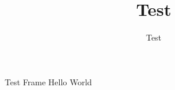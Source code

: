 \documentclass[aspectratio=169]{beamer}
\title{Test}
\author{Test}
\begin{document}
\begin{frame}{Test Frame}
Hello World
\end{frame}
\end{document}
